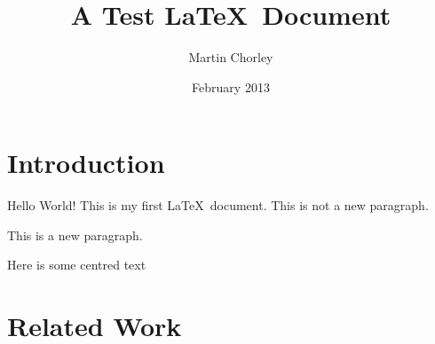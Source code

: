 \documentclass[12pt,twoside,a4paper]{article}
\title{A Test \LaTeX\ Document}
\author{Martin Chorley}
\date{February 2013}
\begin{document}
\maketitle

\begin{abstract}
\lipsum[2]
\end{abstract}

\section*{Introduction}
{\Huge Hello World!} This is       my       first       \LaTeX\     document.
This is not a new paragraph.

This is a new paragraph.
\begin{center}{\tiny Here is some centred text}\end{center}

\lipsum[1-4]

\section{Related Work}
\lipsum[5-6]
\end{document}

